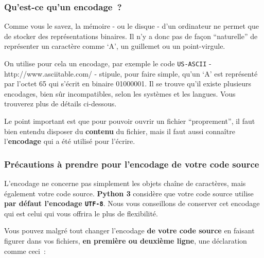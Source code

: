     \begin{Shaded}
\begin{Highlighting}[frame=lines,framerule=0.6mm,rulecolor=\color{asisframecolor}]
\end{Highlighting}
\end{Shaded}

    \hypertarget{quest-ce-quun-encodage}{%
\subsubsection{Qu'est-ce qu'un
encodage~?}\label{quest-ce-quun-encodage}}

    Comme vous le savez, la mémoire - ou le disque - d'un ordinateur ne
permet que de stocker des représentations binaires. Il n'y a donc pas de
façon ``naturelle'' de représenter un caractère comme `A', un guillemet
ou un point-virgule.

On utilise pour cela un encodage, par exemple le code \texttt{US-ASCII}
- http://www.asciitable.com/ - stipule, pour faire simple, qu'un `A' est
représenté par l'octet 65 qui s'écrit en binaire 01000001. Il se trouve
qu'il existe plusieurs encodages, bien sûr incompatibles, selon les
systèmes et les langues. Vous trouverez plus de détails ci-dessous.

Le point important est que pour pouvoir ouvrir un fichier
``proprement'', il faut bien entendu disposer du \textbf{contenu} du
fichier, mais il faut aussi connaître l'\textbf{encodage} qui a été
utilisé pour l'écrire.

    \hypertarget{pruxe9cautions-uxe0-prendre-pour-lencodage-de-votre-code-source}{%
\subsubsection{Précautions à prendre pour l'encodage de votre code
source}\label{pruxe9cautions-uxe0-prendre-pour-lencodage-de-votre-code-source}}

    L'encodage ne concerne pas simplement les objets chaîne de caractères,
mais également votre code source. \textbf{Python 3} considère que votre
code source utilise \textbf{par défaut l'encodage \texttt{UTF-8}}. Nous
vous conseillons de conserver cet encodage qui est celui qui vous
offrira le plus de flexibilité.

    Vous pouvez malgré tout changer l'encodage \textbf{de votre code source}
en faisant figurer dans vos fichiers, \textbf{en première ou deuxième
ligne}, une déclaration comme ceci~:

